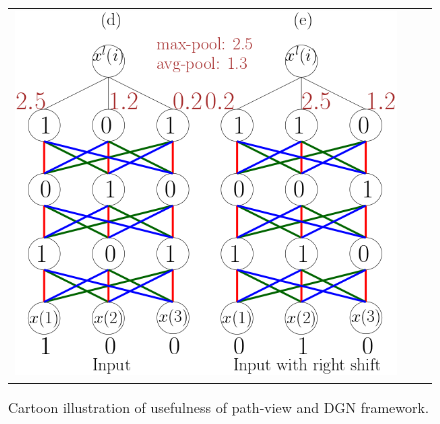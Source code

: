 \begin{figure}
{\begin{tabular}{ccc}
\includegraphics[scale=0.5]{figs/nnconv.png}
\end{tabular}
}
\caption{Cartoon illustration of usefulness of path-view and DGN framework.}
\label{fig:cartoon}
\end{figure}

